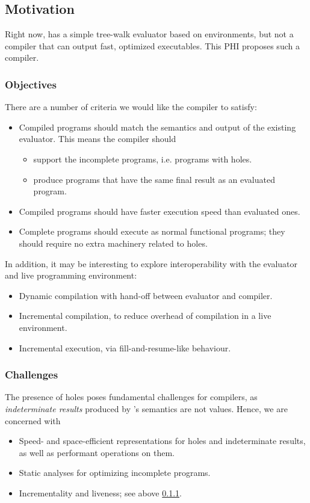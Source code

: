 \documentclass[index.tex]{subfiles}
\begin{document}
\subsection{Motivation}
\label{motivation}
Right now, \Hazel{} has a simple tree-walk evaluator based on environments, but not a compiler that
can output fast, optimized executables. This PHI proposes such a compiler.

\subsubsection{Objectives}
\label{objectives}
There are a number of criteria we would like the compiler to satisfy: 
%
\begin{itemize}
  \item Compiled programs should match the semantics and output of the existing evaluator. This
    means the compiler should
    \begin{itemize}
      \item support the incomplete programs, i.e. programs with holes.
      \item produce programs that have the same final result as an evaluated program.
    \end{itemize}

  \item Compiled programs should have faster execution speed than evaluated ones.
  \item Complete \Hazel{} programs should execute as normal functional programs; they should require
    no extra machinery related to holes.
\end{itemize}
%
In addition, it may be interesting to explore interoperability with the evaluator and live
programming environment:
%
\begin{itemize}
  \item Dynamic compilation with hand-off between evaluator and compiler.
  \item Incremental compilation, to reduce overhead of compilation in a live environment.
  \item Incremental execution, via fill-and-resume-like behaviour.
\end{itemize}

\subsubsection{Challenges}
\label{challenges}
The presence of holes poses fundamental challenges for compilers, as \emph{indeterminate results}
produced by \Hazel's semantics are not values. Hence, we are concerned with
%
\begin{itemize}
  \item Speed- and space-efficient representations for holes and indeterminate results, as well as
    performant operations on them.
  \item Static analyses for optimizing incomplete programs.
  \item Incrementality and liveness; see above \cref{objectives}.
\end{itemize}
\end{document}

